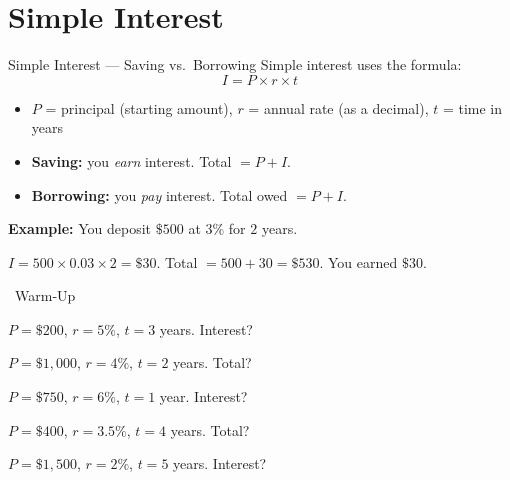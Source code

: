 \section{Simple Interest}

\begin{quickReview}{Simple Interest --- Saving vs.\ Borrowing}
Simple interest uses the formula:
$$I = P \times r \times t$$
\begin{itemize}[leftmargin=*]
    \item $P$ = principal (starting amount), \; $r$ = annual rate (as a decimal), \; $t$ = time in years
    \item \textbf{Saving:} you \emph{earn} interest. Total $= P + I$.
    \item \textbf{Borrowing:} you \emph{pay} interest. Total owed $= P + I$.
\end{itemize}

\medskip
\textbf{Example:} You deposit $\$500$ at $3\%$ for $2$ years.

$I = 500 \times 0.03 \times 2 = \$30$. Total $= 500 + 30 = \$530$. You earned $\$30$.
\end{quickReview}

\begin{practiceBox}[funGreen]{\faSun~Warm-Up}


\prob $P = \$200$, $r = 5\%$, $t = 3$ years. Interest? \answerBlank[3cm]

\prob $P = \$1{,}000$, $r = 4\%$, $t = 2$ years. Total? \answerBlank[3cm]

\prob $P = \$750$, $r = 6\%$, $t = 1$ year. Interest? \answerBlank[3cm]

\prob $P = \$400$, $r = 3.5\%$, $t = 4$ years. Total? \answerBlank[3cm]

\prob $P = \$1{,}500$, $r = 2\%$, $t = 5$ years. Interest? \answerBlank[3cm]
\end{practiceBox}

